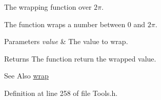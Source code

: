 The wrapping function over $2\pi$. 

The function wraps a number between 0 and $2\pi$.


\begin{DoxyParams}{Parameters}
{\em value} & The value to wrap. \\
\hline
\end{DoxyParams}
\begin{DoxyReturn}{Returns}
The function return the wrapped value.
\end{DoxyReturn}
\begin{DoxySeeAlso}{See Also}
\hyperlink{namespace_hoa3_d_a797e7afd706be7e4c1b5961214991f35}{wrap} 
\end{DoxySeeAlso}


Definition at line 258 of file Tools.\-h.

